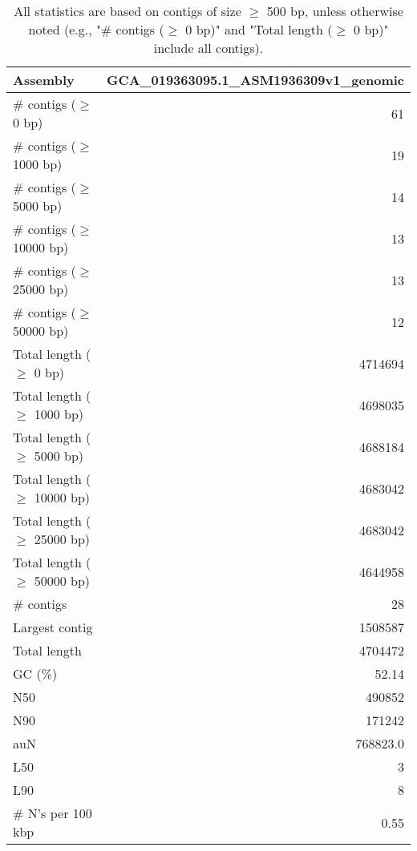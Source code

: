 \documentclass[12pt,a4paper]{article}
\begin{document}
\begin{table}[ht]
\begin{center}
\caption{All statistics are based on contigs of size $\geq$ 500 bp, unless otherwise noted (e.g., "\# contigs ($\geq$ 0 bp)" and "Total length ($\geq$ 0 bp)" include all contigs).}
\begin{tabular}{|l*{1}{|r}|}
\hline
Assembly & GCA\_019363095.1\_ASM1936309v1\_genomic \\ \hline
\# contigs ($\geq$ 0 bp) & 61 \\ \hline
\# contigs ($\geq$ 1000 bp) & 19 \\ \hline
\# contigs ($\geq$ 5000 bp) & 14 \\ \hline
\# contigs ($\geq$ 10000 bp) & 13 \\ \hline
\# contigs ($\geq$ 25000 bp) & 13 \\ \hline
\# contigs ($\geq$ 50000 bp) & 12 \\ \hline
Total length ($\geq$ 0 bp) & 4714694 \\ \hline
Total length ($\geq$ 1000 bp) & 4698035 \\ \hline
Total length ($\geq$ 5000 bp) & 4688184 \\ \hline
Total length ($\geq$ 10000 bp) & 4683042 \\ \hline
Total length ($\geq$ 25000 bp) & 4683042 \\ \hline
Total length ($\geq$ 50000 bp) & 4644958 \\ \hline
\# contigs & 28 \\ \hline
Largest contig & 1508587 \\ \hline
Total length & 4704472 \\ \hline
GC (\%) & 52.14 \\ \hline
N50 & 490852 \\ \hline
N90 & 171242 \\ \hline
auN & 768823.0 \\ \hline
L50 & 3 \\ \hline
L90 & 8 \\ \hline
\# N's per 100 kbp & 0.55 \\ \hline
\end{tabular}
\end{center}
\end{table}
\end{document}
